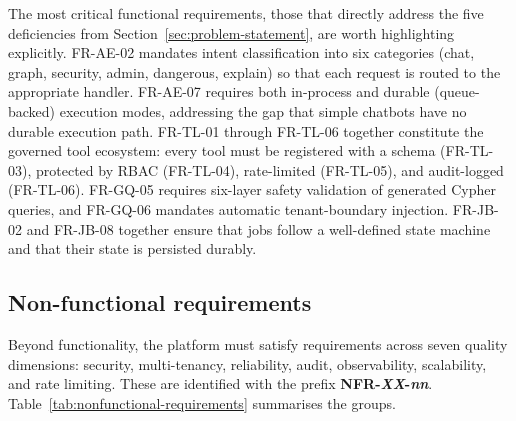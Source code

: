 \documentclass[a4paper,noexaminfo]{sapthesis}
\begin{document}
The most critical functional requirements, those that directly address the
five deficiencies from Section~\ref{sec:problem-statement}, are worth
highlighting explicitly.  FR-AE-02 mandates intent classification into
six categories (chat, graph, security, admin, dangerous, explain) so that
each request is routed to the appropriate handler.  FR-AE-07 requires both
in-process and durable (queue-backed) execution modes, addressing the gap
that simple chatbots have no durable execution path.  FR-TL-01 through FR-TL-06
together constitute the governed tool ecosystem: every tool must be
registered with a schema (FR-TL-03), protected by RBAC (FR-TL-04),
rate-limited (FR-TL-05), and audit-logged (FR-TL-06).  FR-GQ-05 requires
six-layer safety validation of generated Cypher queries, and FR-GQ-06
mandates automatic tenant-boundary injection.  FR-JB-02 and FR-JB-08
together ensure that jobs follow a well-defined state machine and that
their state is persisted durably.

\subsection{Non-functional requirements}
\label{sec:non-functional-requirements}

Beyond functionality, the platform must satisfy requirements across seven
quality dimensions: security, multi-tenancy, reliability, audit,
observability, scalability, and rate limiting.  These are identified with the prefix
\textbf{NFR-\emph{XX}-\emph{nn}}.  Table~\ref{tab:nonfunctional-requirements}
summarises the groups.
\end{document}
